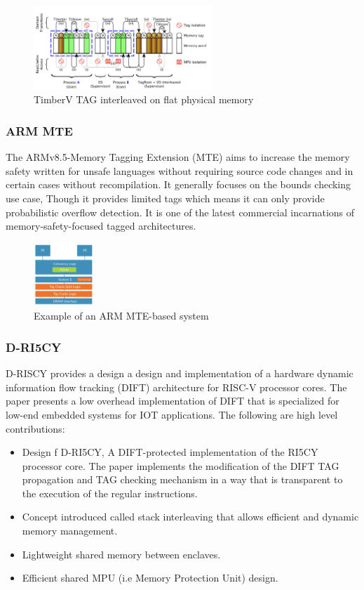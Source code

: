  \begin{figure}[htbp!] 
  \centering
  \includegraphics[width=0.6\textwidth]{Timber-V}
  \caption[MTE]{TimberV TAG interleaved on flat physical memory\cite{weiser_timber-v_2019}}
  \label{fig:MTE}
  \end{figure}
	
\subsubsection{ARM MTE}
The ARMv8.5-Memory Tagging Extension (MTE)\cite{ARMMTE} aims to increase the memory safety written for 
unsafe languages without requiring source code changes and in certain cases without 
recompilation. It generally focuses on the bounds checking use case, Though it 
provides limited tags which means it can only provide probabilistic overflow detection. 
It is one of the latest commercial incarnations of memory-safety-focused tagged architectures.   

\begin{figure}[htbp!] 
  \centering    
  \includegraphics[width=0.2\textwidth]{ARMMTE}
  \caption[MTE]{Example of an ARM MTE-based system \cite{ARMMTE}}
  \label{fig:MTE}
  \end{figure}

\subsubsection{D-RI5CY}
D-RISCY\cite{D-RISCY} provides a design a design and implementation of a hardware dynamic information flow 
tracking (DIFT) architecture for RISC-V processor cores. The paper presents a low 
overhead implementation of DIFT that is specialized for low-end embedded systems
for IOT applications. The following are high level contributions:
\begin{itemize}
  \item Design f D-RI5CY, A DIFT-protected implementation of the RI5CY processor core. 
        The paper implements the modification of the DIFT TAG propagation and TAG checking
        mechanism in a way that is transparent to the execution of the regular instructions. 
  \item Concept introduced called stack interleaving that allows efficient and dynamic memory management.
  \item Lightweight shared memory between enclaves.
  \item Efficient shared MPU (i.e Memory Protection Unit) design.
\end{itemize}

